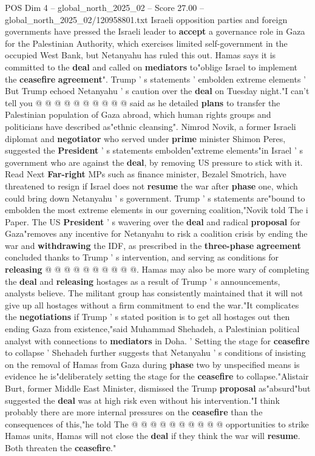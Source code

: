 \begin{textsample}{POS Dim 4 – global\_north\_2025\_02 – Score 27.00 – global\_north\_2025\_02/120958801.txt}
Israeli opposition parties and foreign governments have pressed the Israeli leader to \textbf{accept} a governance role in Gaza for the Palestinian Authority, which exercises limited self-government in the occupied West Bank, but Netanyahu has ruled this out.
Hamas says it is committed to the \textbf{deal} and called on \textbf{mediators} to"oblige Israel to implement the \textbf{ceasefire} \textbf{agreement}".
Trump ' s statements ' embolden extreme elements ' But Trump echoed Netanyahu ' s caution over the \textbf{deal} on Tuesday night."I can't tell you @ @ @ @ @ @ @ @ @ @ said as he detailed \textbf{plans} to transfer the Palestinian population of Gaza abroad, which human rights groups and politicians have described as"ethnic cleansing".
Nimrod Novik, a former Israeli diplomat and \textbf{negotiator} who served under \textbf{prime} minister Shimon Peres, suggested the \textbf{President} ' s statements embolden"extreme elements"in Israel ' s government who are against the \textbf{deal}, by removing US pressure to stick with it.
Read Next \textbf{Far-right} MPs such as finance minister, Bezalel Smotrich, have threatened to resign if Israel does not \textbf{resume} the war after \textbf{phase} one, which could bring down Netanyahu ' s government.
Trump ' s statements are"bound to embolden the most extreme elements in our governing coalition,"Novik told The i Paper.
The US \textbf{President} ' s wavering over the \textbf{deal} and radical \textbf{proposal} for Gaza"removes any incentive for Netanyahu to risk a coalition crisis by ending the war and \textbf{withdrawing} the IDF, as prescribed in the \textbf{three-phase} \textbf{agreement} concluded thanks to Trump ' s intervention, and serving as conditions for \textbf{releasing} @ @ @ @ @ @ @ @ @ @.
Hamas may also be more wary of completing the \textbf{deal} and \textbf{releasing} hostages as a result of Trump ' s announcements, analysts believe.
The militant group has consistently maintained that it will not give up all hostages without a firm commitment to end the war."It complicates the \textbf{negotiations} if Trump ' s stated position is to get all hostages out then ending Gaza from existence,"said Muhammad Shehadeh, a Palestinian political analyst with connections to \textbf{mediators} in Doha. ' Setting the stage for \textbf{ceasefire} to collapse ' Shehadeh further suggests that Netanyahu ' s conditions of insisting on the removal of Hamas from Gaza during \textbf{phase} two by unspecified means is evidence he is"deliberately setting the stage for the \textbf{ceasefire} to collapse."Alistair Burt, former Middle East Minister, dismissed the Trump \textbf{proposal} as"absurd"but suggested the \textbf{deal} was at high risk even without his intervention."I think probably there are more internal pressures on the \textbf{ceasefire} than the consequences of this,"he told The @ @ @ @ @ @ @ @ @ @ opportunities to strike Hamas units, Hamas will not close the \textbf{deal} if they think the war will \textbf{resume}.
Both threaten the \textbf{ceasefire}."


\end{textsample}
